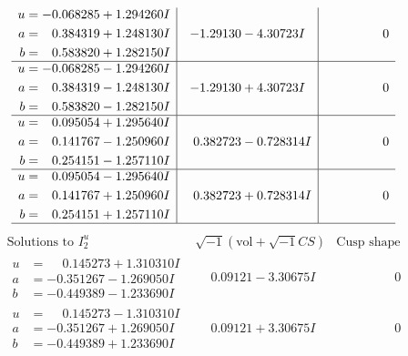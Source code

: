 \documentclass[1p]{elsarticle_modified}
\theoremstyle{definition}
\newcommand{\I}{\sqrt{-1}}
\begin{document}
$$\begin{array}{c|c|c}
\begin{aligned}
u &= -0.068285 + 1.294260 I \\
a &= \phantom{-}0.384319 + 1.248130 I \\
b &= \phantom{-}0.583820 + 1.282150 I\end{aligned}
 & -1.29130 - 4.30723 I & \phantom{-0.000000 } 0 \\ \hline\begin{aligned}
u &= -0.068285 - 1.294260 I \\
a &= \phantom{-}0.384319 - 1.248130 I \\
b &= \phantom{-}0.583820 - 1.282150 I\end{aligned}
 & -1.29130 + 4.30723 I & \phantom{-0.000000 } 0 \\ \hline\begin{aligned}
u &= \phantom{-}0.095054 + 1.295640 I \\
a &= \phantom{-}0.141767 - 1.250960 I \\
b &= \phantom{-}0.254151 - 1.257110 I\end{aligned}
 & \phantom{-}0.382723 - 0.728314 I & \phantom{-0.000000 } 0 \\ \hline\begin{aligned}
u &= \phantom{-}0.095054 - 1.295640 I \\
a &= \phantom{-}0.141767 + 1.250960 I \\
b &= \phantom{-}0.254151 + 1.257110 I\end{aligned}
 & \phantom{-}0.382723 + 0.728314 I & \phantom{-0.000000 } 0\\
 \hline 
 \end{array}$$\newpage$$\begin{array}{c|c|c}  
\text{Solutions to }I^u_{2}& \I (\text{vol} + \sqrt{-1}CS) & \text{Cusp shape}\\
 \hline 
\begin{aligned}
u &= \phantom{-}0.145273 + 1.310310 I \\
a &= -0.351267 - 1.269050 I \\
b &= -0.449389 - 1.233690 I\end{aligned}
 & \phantom{-}0.09121 - 3.30675 I & \phantom{-0.000000 } 0 \\ \hline\begin{aligned}
u &= \phantom{-}0.145273 - 1.310310 I \\
a &= -0.351267 + 1.269050 I \\
b &= -0.449389 + 1.233690 I\end{aligned}
 & \phantom{-}0.09121 + 3.30675 I & \phantom{-0.000000 } 0 \\ \hline\begin{aligned}

\end{aligned}
\end{array}$$
\end{document}
